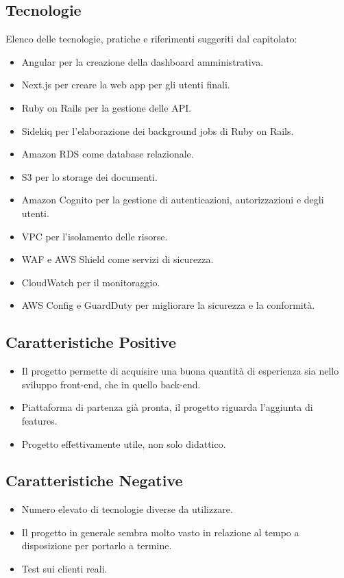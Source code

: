 \documentclass[a4paper,12pt]{article}
\begin{document}
    \subsection{Tecnologie}
    Elenco delle tecnologie, pratiche e riferimenti suggeriti dal capitolato:
    \begin{itemize}
		\item Angular per la creazione della dashboard amministrativa.
		\item Next.js per creare la web app per gli utenti finali.
		\item Ruby on Rails per la gestione delle API.
		\item Sidekiq per l’elaborazione dei background jobs di Ruby on Rails.
		\item Amazon RDS come database relazionale.
		\item S3 per lo storage dei documenti.
		\item Amazon Cognito per la gestione di autenticazioni, autorizzazioni e degli utenti.
		\item VPC per l’isolamento delle risorse.
		\item WAF e AWS Shield come servizi di sicurezza.
		\item CloudWatch per il monitoraggio.
		\item AWS Config e GuardDuty per migliorare la sicurezza e la conformità.
    \end{itemize}
    \subsection{Caratteristiche Positive}
    \begin{itemize}
	    \item Il progetto permette di acquisire una buona quantità di esperienza sia nello sviluppo front-end, che in quello back-end.
	    \item Piattaforma di partenza già pronta, il progetto riguarda l’aggiunta di features.
	    \item Progetto effettivamente utile, non solo didattico.
    \end{itemize}
    \subsection{Caratteristiche Negative}
    \begin{itemize}
		\item Numero elevato di tecnologie diverse da utilizzare.
		\item Il progetto in generale sembra molto vasto in relazione al tempo a disposizione per portarlo a termine.
		\item Test sui clienti reali.
    \end{itemize}
\end{document}
